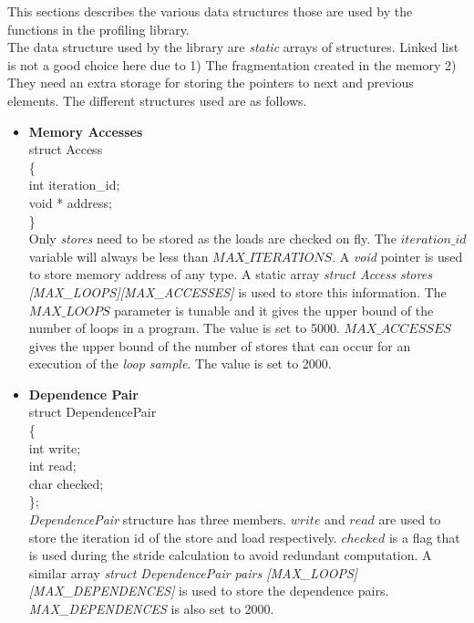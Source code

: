 \documentclass[10pt]{report}          %
\begin{document}
This sections describes the various data structures those are used by the functions in the profiling library.\\
The data structure used by the library are \textit{static} arrays of structures.  Linked list is not a good choice here due to 1) The fragmentation created in the memory 2) They need an extra storage for storing the pointers to next and previous elements.  The different structures used are as follows. 


\begin{itemize}
\item \textbf{Memory Accesses} \\

struct Access \\
\{\\
	\hspace*{1 cm} int iteration\_id; \\
	\hspace*{1 cm} void * address;\\
\} \\
Only \textit{stores} need to be stored as the loads are checked on fly.  The $iteration\_id$ variable will always be less than $MAX\_ITERATIONS$.  A \textit{void} pointer is used to store memory address of any type.  A static array \textit{struct Access  stores [MAX\_LOOPS][MAX\_ACCESSES] }is used to store this information.  The $MAX\_LOOPS$ parameter is tunable and it gives the upper bound of the number of loops in a program. The value is set to 5000. $MAX\_ACCESSES$ gives the upper bound of the number of stores that can occur for an execution of the \textit{loop sample}.  The value is set to 2000.

\item \textbf{Dependence Pair} \\

struct DependencePair\\
\{\\
	\hspace*{1 cm} int write;\\
	\hspace*{1 cm} int read;\\
	\hspace*{1 cm} char checked;\\
\};\\

\textit{DependencePair} structure has three members.  $write$ and $read$ are used to store the iteration id of the store and load respectively.  $checked$ is a flag that is used during the stride calculation to avoid redundant computation.  A similar array \textit{struct DependencePair  pairs [MAX\_LOOPS][MAX\_DEPENDENCES]} is used to store the dependence pairs. 
\\
\textit{MAX\_DEPENDENCES} is also set to 2000.


\end{itemize}
\end{document}
